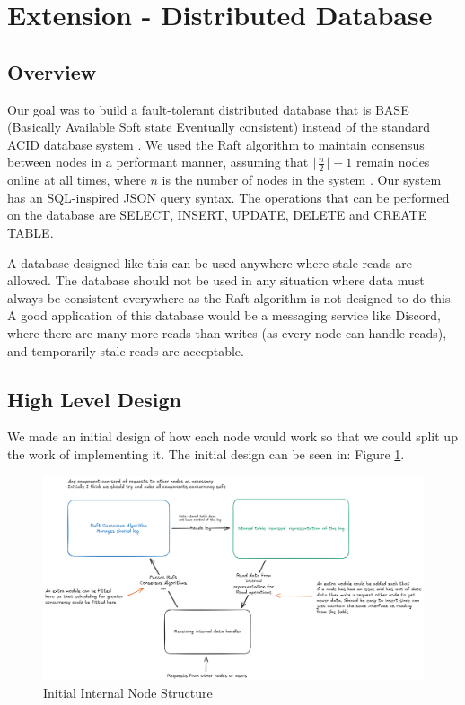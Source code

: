\documentclass[11pt]{article}
\begin{document}
\section{Extension - Distributed Database}

\subsection{Overview}

Our goal was to build a fault-tolerant distributed database that is BASE (Basically Available Soft state Eventually consistent) instead of the standard ACID database system \cite{RefWorks:2025acid}.
We used the Raft algorithm to maintain consensus between nodes in a performant manner, assuming that $\lfloor\frac{n}{2}\rfloor + 1$ remain nodes online at all times, where $n$ is the number of nodes in the system \cite{RefWorks:ongaro2014search}.
Our system has an SQL-inspired JSON query syntax. The operations that can be performed on the database are SELECT, INSERT, UPDATE, DELETE and CREATE TABLE.

A database designed like this can be used anywhere where stale reads are allowed. The database should not be used in any situation where data must always be consistent everywhere as the Raft algorithm is not designed to do this. A good application of this database would be a messaging service like Discord, where there are many more reads than writes (as every node can handle reads), and temporarily stale reads are acceptable.

\subsection{High Level Design}

We made an initial design of how each node would work so that we could split up the work of implementing it. The initial design can be seen in: Figure \ref{InitialNodeDesign}.

\begin{figure}[ht]
    \centering
    \includegraphics[width=0.75\linewidth]{InitialNodeDesign.png}
    \caption{Initial Internal Node Structure}
    \label{InitialNodeDesign}
\end{figure}
\end{document}
